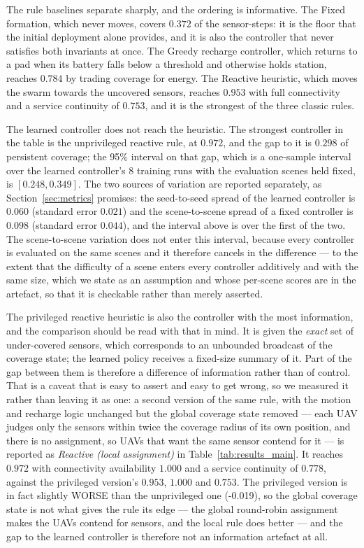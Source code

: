 \documentclass[conference]{IEEEtran}
\begin{document}
The rule baselines separate sharply, and the ordering is informative.  The
Fixed formation, which never moves, covers $0.372$ of the sensor-steps:
it is the floor that the initial deployment alone provides, and it is also
the controller that never satisfies both invariants at once.  The Greedy
recharge controller, which returns to a pad when its battery falls below a
threshold and otherwise holds station, reaches $0.784$ by trading
coverage for energy.  The Reactive heuristic, which moves the swarm towards
the uncovered sensors, reaches $0.953$ with full connectivity and a
service continuity of $0.753$, and it is the strongest of the three
classic rules.

The learned controller does not reach the heuristic.  The strongest
controller in the table is the unprivileged reactive rule, at $0.972$, and
the gap to it is $0.298$ of persistent coverage; the 95\% interval on
that gap, which is a one-sample interval over the learned controller's
8 training runs with the evaluation scenes held fixed, is
$[0.248, 0.349]$.  The two sources of variation are reported separately, as
Section~\ref{sec:metrics} promises: the seed-to-seed spread of the
learned controller is $0.060$ (standard error $0.021$) and
the scene-to-scene spread of a fixed controller is $0.098$ (standard
error $0.044$), and the interval above is over the first of the
two.  The scene-to-scene variation does not enter this
interval, because every controller is evaluated on the same scenes and it
therefore cancels in the difference --- to the extent that the difficulty
of a scene enters every controller additively and with the same size,
which we state as an assumption and whose per-scene scores are in the
artefact, so that it is checkable rather than merely asserted.

The privileged reactive heuristic is also the controller with the most
information, and the comparison should be read with that in mind.  It is
given the \emph{exact} set of under-covered sensors, which corresponds to an
unbounded broadcast of the coverage state; the learned policy receives a
fixed-size summary of it.  Part of the gap between them is therefore a
difference of information rather than of control.  That is a caveat that is
easy to assert and easy to get wrong, so we measured it rather than leaving
it as one: a second version of the same rule, with the motion and recharge
logic unchanged but the global coverage state removed --- each UAV judges
only the sensors within twice the coverage radius of its own position, and
there is no assignment, so UAVs that want the same sensor contend for it
--- is reported as \emph{Reactive (local assignment)} in Table~\ref{tab:results_main}.  It
reaches $0.972$ with connectivity availability $1.000$ and
a service continuity of $0.778$, against the privileged version's
$0.953$, $1.000$ and $0.753$.  The privileged version is in fact slightly WORSE than the unprivileged one (-0.019), so the global coverage state is not what gives the rule its edge --- the global round-robin assignment makes the UAVs contend for sensors, and the local rule does better --- and the gap to the learned controller is therefore not an information artefact at all.
\end{document}
